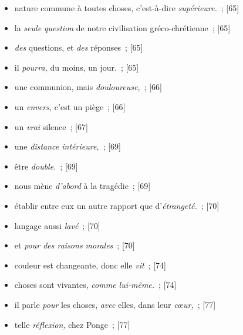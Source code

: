 \documentclass[12pt, a4paper]{article}
\begin{document}
\begin{itemize}
	\item nature commune à toutes choses, c’est-à-dire \textit{supérieure.}{\color{gray}~; [65]}

	\item la \textit{seule question }de notre civilisation gréco-chrétienne{\color{gray}~; [65]}

	\item \textit{des} questions, et \textit{des} réponses{\color{gray}~; [65]}

	\item il \textit{pourra,} du moins, un jour.{\color{gray}~; [65]}

	\item une communion, mais \textit{douloureuse,}{\color{gray}~; [66]}

	\item un \textit{envers,} c’est un piège{\color{gray}~; [66]}

	\item un \textit{vrai} silence{\color{gray}~; [67]}

	\item une \textit{distance intérieure,}{\color{gray}~; [69]}

	\item être \textit{double.}{\color{gray}~; [69]}

	\item nous mène \textit{d’abord} à la tragédie{\color{gray}~; [69]}

	\item établir entre eux un autre rapport que d’\textit{étrangeté.}{\color{gray}~; [70]}

	\item langage aussi \textit{lavé}{\color{gray}~; [70]}

	\item et \textit{pour des raisons morales}{\color{gray}~; [70]}

	\item couleur est changeante, donc elle \textit{vit}{\color{gray}~; [74]}

	\item choses sont vivantes, \textit{comme lui-même.}{\color{gray}~; [74]}

	\item il parle \textit{pour }les choses, \textit{avec} elles, dans leur \textit{cœur,}{\color{gray}~; [77]}

	\item telle \textit{réflexion,} chez Ponge{\color{gray}~; [77]}


\end{itemize}
\end{document}
